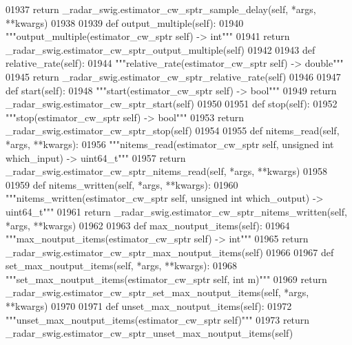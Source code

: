 \begin{DoxyCode}
{{{{{{{{01937         \textcolor{keywordflow}{return} \_radar\_swig.estimator\_cw\_sptr\_sample\_delay(self, *args, **kwargs)
01938 
01939     \textcolor{keyword}{def }output_multiple(self):
01940         \textcolor{stringliteral}{"""output\_multiple(estimator\_cw\_sptr self) -> int"""}
01941         \textcolor{keywordflow}{return} \_radar\_swig.estimator\_cw\_sptr\_output\_multiple(self)
01942 
01943     \textcolor{keyword}{def }relative_rate(self):
01944         \textcolor{stringliteral}{"""relative\_rate(estimator\_cw\_sptr self) -> double"""}
01945         \textcolor{keywordflow}{return} \_radar\_swig.estimator\_cw\_sptr\_relative\_rate(self)
01946 
01947     \textcolor{keyword}{def }start(self):
01948         \textcolor{stringliteral}{"""start(estimator\_cw\_sptr self) -> bool"""}
01949         \textcolor{keywordflow}{return} \_radar\_swig.estimator\_cw\_sptr\_start(self)
01950 
01951     \textcolor{keyword}{def }stop(self):
01952         \textcolor{stringliteral}{"""stop(estimator\_cw\_sptr self) -> bool"""}
01953         \textcolor{keywordflow}{return} \_radar\_swig.estimator\_cw\_sptr\_stop(self)
01954 
01955     \textcolor{keyword}{def }nitems_read(self, *args, **kwargs):
01956         \textcolor{stringliteral}{"""nitems\_read(estimator\_cw\_sptr self, unsigned int which\_input) -> uint64\_t"""}
01957         \textcolor{keywordflow}{return} \_radar\_swig.estimator\_cw\_sptr\_nitems\_read(self, *args, **kwargs)
01958 
01959     \textcolor{keyword}{def }nitems_written(self, *args, **kwargs):
01960         \textcolor{stringliteral}{"""nitems\_written(estimator\_cw\_sptr self, unsigned int which\_output) -> uint64\_t"""}
01961         \textcolor{keywordflow}{return} \_radar\_swig.estimator\_cw\_sptr\_nitems\_written(self, *args, **kwargs)
01962 
01963     \textcolor{keyword}{def }max_noutput_items(self):
01964         \textcolor{stringliteral}{"""max\_noutput\_items(estimator\_cw\_sptr self) -> int"""}
01965         \textcolor{keywordflow}{return} \_radar\_swig.estimator\_cw\_sptr\_max\_noutput\_items(self)
01966 
01967     \textcolor{keyword}{def }set_max_noutput_items(self, *args, **kwargs):
01968         \textcolor{stringliteral}{"""set\_max\_noutput\_items(estimator\_cw\_sptr self, int m)"""}
01969         \textcolor{keywordflow}{return} \_radar\_swig.estimator\_cw\_sptr\_set\_max\_noutput\_items(self, *args, **kwargs)
01970 
01971     \textcolor{keyword}{def }unset_max_noutput_items(self):
01972         \textcolor{stringliteral}{"""unset\_max\_noutput\_items(estimator\_cw\_sptr self)"""}
01973         \textcolor{keywordflow}{return} \_radar\_swig.estimator\_cw\_sptr\_unset\_max\_noutput\_items(self)
}}}}}}}}
\end{DoxyCode}
